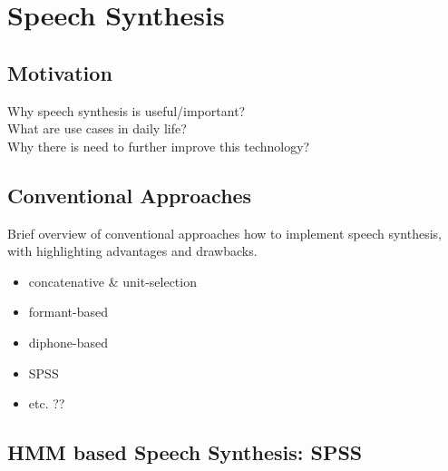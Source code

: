 

\section{Speech Synthesis}
\label{sec:speech}

\subsection{Motivation}

Why speech synthesis is useful/important?\\What are use cases in daily life?\\Why there is need to further improve this technology?

\subsection{Conventional Approaches}
\label{subsec:convenspeech}

Brief overview of conventional approaches how to implement speech synthesis, with highlighting advantages and drawbacks.

\begin{itemize}[leftmargin=10pt]
	\item concatenative \& unit-selection
	\item formant-based
	\item diphone-based
	\item \ac{SPSS}
	\item etc. ??
\end{itemize}

\subsection{HMM based Speech Synthesis: \ac{SPSS}}
\label{subsec:hmmspeech}

